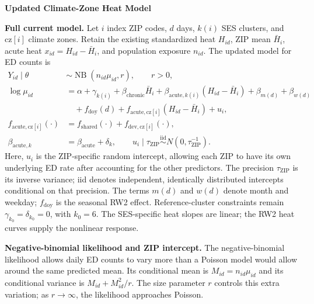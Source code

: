 \documentclass[10pt]{article}
\begin{document}
\begin{center}\large\bfseries Updated Climate-Zone Heat Model\end{center}

\textbf{Full current model.}
Let $i$ index ZIP codes, $d$ days, $k(i)$ SES clusters, and $\mathrm{cz}[i]$
climate zones. Retain the existing standardized heat $H_{id}$, ZIP mean
$\bar H_i$, acute heat $x_{id}=H_{id}-\bar H_i$, and population exposure $n_{id}$.
The updated model for ED counts is
\begin{align}
Y_{id}\mid\theta&\sim\operatorname{NB}(n_{id}\mu_{id},r),\qquad r>0,\nonumber\\
\log\mu_{id}&=\alpha+\gamma_{k(i)}+\beta_{\mathrm{chronic}}\bar H_i
+\beta_{\mathrm{acute},k(i)}(H_{id}-\bar H_i)
+\beta_{m(d)}+\beta_{w(d)}\nonumber\\
&\quad+f_{\mathrm{doy}}(d)
+f_{\mathrm{acute},\mathrm{cz}[i]}(H_{id}-\bar H_i)+u_i,\label{eq:model}\\
f_{\mathrm{acute},\mathrm{cz}[i]}(\cdot)
&=f_{\mathrm{shared}}(\cdot)+f_{\mathrm{dev},\mathrm{cz}[i]}(\cdot),\nonumber\\
\beta_{\mathrm{acute},k}&=\beta_{\mathrm{acute}}+\delta_k,\qquad
u_i\mid\tau_{\mathrm{ZIP}}\overset{\mathrm{iid}}{\sim}N(0,\tau_{\mathrm{ZIP}}^{-1}).\nonumber
\end{align}
Here, $u_i$ is the ZIP-specific random intercept, allowing each ZIP to have
its own underlying ED rate after accounting for the other predictors.
The precision $\tau_{\mathrm{ZIP}}$ is its inverse variance; iid denotes
independent, identically distributed intercepts conditional on that precision.
The terms $m(d)$ and $w(d)$ denote month and weekday; $f_{\mathrm{doy}}$ is the
seasonal RW2 effect. Reference-cluster constraints remain
$\gamma_{k_0}=\delta_{k_0}=0$, with $k_0=6$.
The SES-specific heat slopes are linear; the RW2 heat curves supply the
nonlinear response.

\textbf{Negative-binomial likelihood and ZIP intercept.}
The negative-binomial likelihood allows daily ED counts to vary more than
a Poisson model would allow around the same predicted mean.
Its conditional mean is $M_{id}=n_{id}\mu_{id}$ and its conditional variance
is $M_{id}+M_{id}^2/r$. The size parameter $r$ controls this extra variation;
as $r\to\infty$, the likelihood approaches Poisson.
\end{document}
